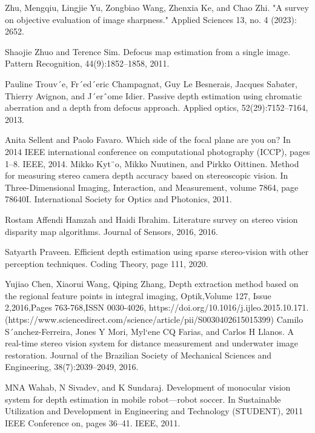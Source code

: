 \begin{thebibliography}{9}
 Zhu, Mengqiu, Lingjie Yu, Zongbiao Wang, Zhenxia Ke, and Chao Zhi. "A survey on objective evaluation of image sharpness." Applied Sciences 13, no. 4 (2023): 2652.
\end{thebibliography}


 Shaojie Zhuo and Terence Sim. Defocus map estimation from a single image. Pattern Recognition, 44(9):1852–1858, 2011.

 Pauline Trouv´e, Fr´ed´eric Champagnat, Guy Le Besnerais, Jacques
Sabater, Thierry Avignon, and J´erˆome Idier. Passive depth estimation
using chromatic aberration and a depth from defocus approach. Applied
optics, 52(29):7152–7164, 2013.

 Anita Sellent and Paolo Favaro. Which side of the focal plane are
you on? In 2014 IEEE international conference on computational
photography (ICCP), pages 1–8. IEEE, 2014.
 Mikko Kyt¨o, Mikko Nuutinen, and Pirkko Oittinen. Method for
measuring stereo camera depth accuracy based on stereoscopic vision.
In Three-Dimensional Imaging, Interaction, and Measurement, volume
7864, page 78640I. International Society for Optics and Photonics, 2011.

 Rostam Affendi Hamzah and Haidi Ibrahim. Literature survey on stereo vision disparity map algorithms. Journal of Sensors, 2016, 2016.

 Satyarth Praveen. Efficient depth estimation using sparse stereo-vision with other perception techniques. Coding Theory, page 111, 2020.

Yujiao Chen, Xiaorui Wang, Qiping Zhang,
Depth extraction method based on the regional feature points in integral imaging,
Optik,Volume 127, Issue 2,2016,Pages 763-768,ISSN 0030-4026,
https://doi.org/10.1016/j.ijleo.2015.10.171.
(https://www.sciencedirect.com/science/article/pii/S0030402615015399)
 Camilo S´anchez-Ferreira, Jones Y Mori, Myl`ene CQ Farias, and Carlos H Llanos. A real-time stereo vision system for distance measurement
and underwater image restoration. Journal of the Brazilian Society of
Mechanical Sciences and Engineering, 38(7):2039–2049, 2016.

 MNA Wahab, N Sivadev, and K Sundaraj. Development of monocular
vision system for depth estimation in mobile robot—robot soccer. In
Sustainable Utilization and Development in Engineering and Technology
(STUDENT), 2011 IEEE Conference on, pages 36–41. IEEE, 2011.

